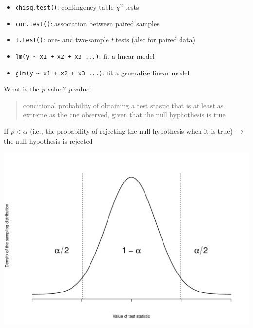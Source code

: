 \documentclass[
  ignorenonframetext,
]{beamer}
\providecommand{\tightlist}{%
  \setlength{\itemsep}{0pt}\setlength{\parskip}{0pt}}
\begin{document}
\begin{frame}[fragile]{}
\protect\hypertarget{section-10}{}
\begin{itemize}
\tightlist
\item
  \texttt{chisq.test()}: contingency table \(\chi^2\) tests
\item
  \texttt{cor.test()}: association between paired samples
\item
  \texttt{t.test()}: one- and two-sample \emph{t} tests (also for paired
  data)
\item
  \texttt{lm(y\ \textasciitilde{}\ x1\ +\ x2\ +\ x3\ ...)}: fit a linear
  model
\item
  \texttt{glm(y\ \textasciitilde{}\ x1\ +\ x2\ +\ x3\ ...)}: fit a
  generalize linear model
\end{itemize}
\end{frame}

\begin{frame}{What is the \emph{p}-value?}
\protect\hypertarget{what-is-the-p-value}{}
\emph{p}-value:

\begin{quote}
conditional probability of obtaining a test stastic that is at least as
extreme as the one observed, given that the null hyphothesis is true
\end{quote}

If \(p < \alpha\) (i.e., the probability of rejecting the null
hypothesis when it is true) \(\rightarrow\) the null hypothesis is
rejected

\begin{center}\includegraphics[width=0.5\linewidth]{Practice_files/figure-beamer/unnamed-chunk-89-1} \end{center}
\end{frame}
\end{document}
